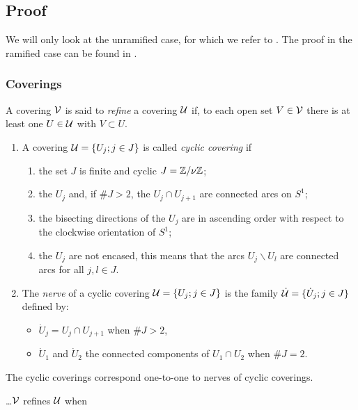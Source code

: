 \subsection{Proof}\label{sec:proofOfMatrixThm}
We will only look at the unramified case, for which we refer to
\cite[Sec.II.3]{Loday1994}.
The proof in the ramified case can be found in \cite[Sec.II.4]{Loday1994}.

\subsubsection{Coverings}
\begin{comment}
  \cite[Sec.II.1]{Loday1994} and \cite[Sec.II.3.1]{Loday1994}
\end{comment}
A covering $\mathcal{V}$ is said to \emph{refine} a covering $\mathcal{U}$ if, to each open set
$V\in\mathcal{V}$ there is at least one $U\in\mathcal{U}$ with $V\subset U$.
\begin{defn}
  \begin{enumerate}
    \item A covering $\mathcal{U}=\{U_j;j\in J\}$ is called \emph{cyclic covering} if
      \begin{enumerate}
        \item the set $J$ is finite and cyclic $J=\mathbb{Z}/\nu\mathbb{Z}$;
        \item the $U_j$ and, if $\#J>2$, the $U_j\cap U_{j+1}$ are connected
          arcs on $S^1$;
        \item the bisecting directions of the $U_j$ are in ascending order with
          respect to the clockwise orientation of $S^1$;
        \item the $U_j$ are not encased, this means that the arcs
          $U_j\backslash U_l$ are connected arcs for all $j,l\in J$.
      \end{enumerate}
    \item The \emph{nerve} of a cyclic covering $\mathcal{U}=\{U_j;j\in J\}$ is the
      family $\dot{\mathcal{U}}=\{\dot U_j;j\in J\}$ defined by:
      \begin{itemize}
        \item $\dot U_j=U_j\cap U_{j+1}$ when $\#J>2$,
        \item $\dot U_1$ and $\dot U_2$ the connected components of
          $U_1\cap U_2$ when $\#J=2$.
      \end{itemize}
  \end{enumerate}
\end{defn}
The cyclic coverings correspond one-to-one to nerves of cyclic coverings.
\begin{prop}
  \dots $\mathcal{V}$ refines $\mathcal{U}$ when \TODO{}
\end{prop}

